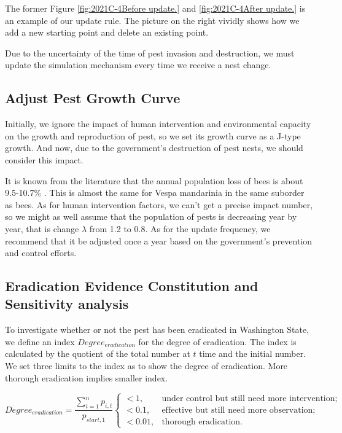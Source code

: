 The former Figure \ref{fig:2021C-4Before update.} and \ref{fig:2021C-4After update.} is an example of our update rule. The picture on the right vividly shows how we add a new starting point and delete an existing point.

Due to the uncertainty of the time of pest invasion and destruction, we must update the simulation mechanism every time we receive a nest change.

\subsection{Adjust Pest Growth Curve}
Initially, we ignore the impact of human intervention and environmental capacity on the growth and reproduction of pest, so we set its growth curve as a J-type growth. And now, due to the government's destruction of pest nests, we should consider this impact.

It is known from the literature that the annual population loss of bees is about 9.5-10.7\% \parencite{Chinesebee}. This is almost the same for Vespa mandarinia  in the same suborder as bees. As for human intervention factors, we can't get a precise impact number, so we might as well assume that the population of pests is decreasing year by year, that is change $\lambda$ from 1.2 to 0.8. 
As for the update frequency, we recommend that it be adjusted once a year based on the government's prevention and control efforts.

\subsection{Eradication Evidence Constitution and Sensitivity analysis}

To investigate whether or not the pest has been eradicated in Washington State, we define an index $Degree_{eradication}$ for the degree of eradication. The index is calculated by the quotient of the total number at $t$ time and the initial number. We set three limits to the index as to show the degree of eradication. More thorough eradication implies smaller index.

\begin{equation*}
    \label{eq:degree}
    Degree_{eradication} = \frac{\sum^n_{i=1} p_{i,t}}{p_{start,1}} \begin{cases}
    <1, & \text{under control but still need more intervention}; \\
    <0.1, & \text{effective but still need more observation}; \\
    <0.01, & \text{thorough eradication}.
    \end{cases}
\end{equation*}

